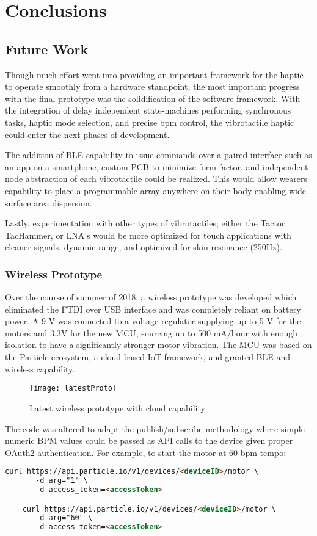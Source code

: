 
\chapter{Conclusions} \label{chapConclusions}


\section{Future Work}
Though much effort went into providing an important framework for the haptic to operate smoothly from a hardware standpoint, the most important progress with the final prototype was the solidification of the software framework. With the integration of delay independent state-machines performing synchronous tasks, haptic mode selection, and precise bpm control, the vibrotactile haptic could enter the next phases of development. 

The addition of BLE capability to issue commands over a paired interface such as an app on a smartphone, custom PCB to minimize form factor, and independent node abstraction of each vibrotactile could be realized. This would allow wearers capability to place a programmable array anywhere on their body enabling wide surface area dispersion. 

Lastly, experimentation with other types of vibrotactiles; either the Tactor, TacHammer, or LNA's would be more optimized for touch applications with cleaner signals, dynamic range, and optimized for skin resonance (250Hz).

\subsection{Wireless Prototype}
Over the course of summer of 2018, a wireless prototype was developed which eliminated the FTDI over USB interface and was completely reliant on battery power. A 9 V was connected to a voltage regulator supplying up to 5 V for the motors and 3.3V for the new MCU, sourcing up to 500 mA/hour with enough isolation to have a significantly stronger motor vibration. The MCU was based on the Particle ecosystem, a cloud based IoT framework, and granted BLE and wireless capability. 
\begin{figure}[H]
    \centering
    \texttt{[image: latestProto]}
    \caption{Latest wireless prototype with cloud capability}
\end{figure}
The code was altered to adapt the publish/subscribe methodology where simple numeric BPM values could be passed as API calls to the device given proper OAuth2 authentication. For example, to start the motor at 60 bpm tempo:
\begin{lstlisting}[language=html]
    curl https://api.particle.io/v1/devices/<deviceID>/motor \
       -d arg="1" \
       -d access_token=<accessToken>

    curl https://api.particle.io/v1/devices/<deviceID>/motor \
       -d arg="60" \
       -d access_token=<accessToken>
\end{lstlisting}

